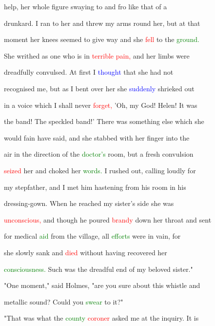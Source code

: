  help, her whole figure swaying to and fro like that of a

 drunkard. I ran to her and threw my arms round her, but at that

 moment her knees seemed to give way and she \textcolor{red}{fell} to the \textcolor{green}{ground.}

 She writhed as one who is in \textcolor{red}{terrible} \textcolor{red}{pain,} and her limbs were

 \textcolor{BurntOrange}{dreadfully} convulsed. At first I \textcolor{blue}{thought} that she had not

 recognised me, but as I bent over her she \textcolor{blue}{suddenly} \textcolor{BurntOrange}{shrieked} out

 in a voice which I shall never \textcolor{red}{forget,} 'Oh, my \textcolor{BurntOrange}{God!} Helen! It was

 the band! The speckled band!' There was something else which she

 would \textcolor{BurntOrange}{fain} have said, and she stabbed with her finger into the

 air in the direction of the \textcolor{green}{doctor's} room, but a fresh convulsion

 \textcolor{red}{seized} her and choked her \textcolor{green}{words.} I rushed out, calling loudly for

 my stepfather, and I met him hastening from his room in his

 dressing-gown. When he reached my sister's side she was

 \textcolor{red}{unconscious,} and though he poured \textcolor{red}{brandy} down her throat and sent

 for \textcolor{BurntOrange}{medical} \textcolor{green}{aid} from the village, all \textcolor{green}{efforts} were in vain, for

 she slowly sank and \textcolor{red}{died} without having recovered her

 \textcolor{green}{consciousness.} Such was the \textcolor{BurntOrange}{dreadful} end of my beloved sister."



 "One moment," said Holmes, "are you sure about this whistle and

 metallic sound? Could you \textcolor{green}{swear} to it?"



 "That was what the \textcolor{green}{county} \textcolor{red}{coroner} asked me at the \textcolor{BurntOrange}{inquiry.} It is

